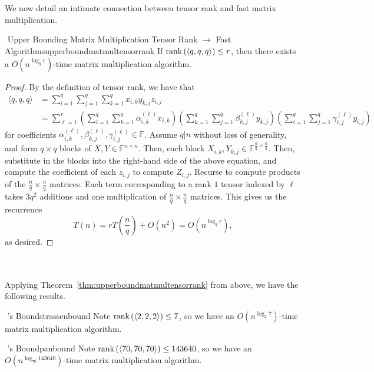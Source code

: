         \vphantom
        \\
        \\
        We now detail an intimate connection between tensor rank and fast matrix multiplication.
        \begin{theorem}{\Stop\,\,Upper Bounding Matrix Multiplication Tensor Rank \(\to\) Fast Algorithms}{upperboundmatmultensorrank}
            If \(\text{rank\,}(\langle q,q,q\rangle)\leq r\), then there exists a \(O\left(n^{\log_qr}\right)\)-time matrix multiplication algorithm.
            \begin{proof}
                By the definition of tensor rank, we have that
                \begin{align*}
                    \langle q,q,q\rangle&=\sum_{i=1}^q\sum_{j=1}^q\sum_{k=1}^q x_{i,k}y_{k,j}z_{i,j} \\
                    &=\sum_{\ell=1}^r\left(\sum_{i=1}^q\sum_{k=1}^q\alpha_{i,k}^{(\ell)} x_{i,k}\right)\left(\sum_{k=1}^q\sum_{j=1}^q\beta_{k,j}^{(\ell)} y_{k,j}\right)\left(\sum_{i=1}^q\sum_{j=1}^q\gamma_{i,j}^{(\ell)} y_{i,j}\right)
                \end{align*}
                for coefficients \(\alpha_{i,k}^{(\ell)},\beta_{k,j}^{(\ell)},\gamma_{i,j}^{(\ell)}\in\mathbb{F}\). Assume \(q|n\) without loss of generality, and form \(q\times q\) blocks of \(X,Y\in\mathbb{F}^{n\times n}\). Then, each block \(X_{i,k}, Y_{k,j}\in\mathbb{F}^{\frac{n}{q}\times\frac{n}{q}}\). Then, substitute in the blocks into the right-hand side of the above equation, and compute the coefficient of each \(z_{i,j}\) to compute \(Z_{i,j}\). Recurse to compute products of the \(\frac{n}{q}\times\frac{n}{q}\) matrices. Each term corresponding to a rank \(1\) tensor indexed by \(\ell\) takes \(3q^2\) additions and one multiplication of \(\frac{n}{q}\times\frac{n}{q}\) matrices. This gives us the recurrence
                \begin{equation*}
                    T(n)=rT\left(\frac{n}{q}\right)+O(n^2)=O\left(n^{\log_q r}\right),
                \end{equation*}
                as desired.
            \end{proof}
        \end{theorem}
        \vphantom
        \\
        \\
        Applying Theorem~\ref{thm:upperboundmatmultensorrank} from above, we have the following results.
        \begin{corollary}{\Stop\,\,\cite{strassen1969gaussian}'s Bound}{strassenbound}
            Note \(\text{rank\,}(\langle 2,2,2\rangle)\leq7\), so we have an \(O\left(n^{\log_2 7}\right)\)-time matrix multiplication algorithm. 
        \end{corollary}
        \begin{corollary}{\Stop\,\,\cite{pan1978strassennotopt}'s Bound}{panbound}
            Note \(\text{rank\,}(\langle 70,70,70\rangle)\leq143640\), so we have an \(O\left(n^{\log_{70} 143640}\right)\)-time matrix multiplication algorithm. 
        \end{corollary}
   
